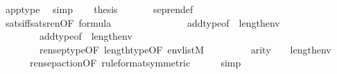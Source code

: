 \begin{isabellebody}
\ app{\isacharunderscore}{\kern0pt}type\ \isamarkupfalse%
\ simp\isanewline
\ \ \isamarkupfalse%
\ {\isacharquery}{\kern0pt}thesis\ \isanewline
\ \ \ \ \isamarkupfalse%
\ sep{\isacharunderscore}{\kern0pt}ren{\isacharunderscore}{\kern0pt}def\isanewline
\ \ \ \ \isamarkupfalse%
\ sats{\isacharunderscore}{\kern0pt}iff{\isacharunderscore}{\kern0pt}sats{\isacharunderscore}{\kern0pt}ren{\isacharbrackleft}{\kern0pt}OF\ {\isacartoucheopen}{\isasymphi}{\isasymin}formula{\isacartoucheclose}\ \ \ \ \ \ \ \isanewline
\ \ \ \ \ \ \ \ add{\isacharunderscore}{\kern0pt}type{\isacharbrackleft}{\kern0pt}of\ {}\ {\isachardoublequoteopen}length{\isacharparenleft}{\kern0pt}env{\isacharparenright}{\kern0pt}{\isachardoublequoteclose}{\isacharbrackright}{\kern0pt}\isanewline
\ \ \ \ \ \ \ \ add{\isacharunderscore}{\kern0pt}type{\isacharbrackleft}{\kern0pt}of\ {}\ {\isachardoublequoteopen}length{\isacharparenleft}{\kern0pt}env{\isacharparenright}{\kern0pt}{\isachardoublequoteclose}{\isacharbrackright}{\kern0pt}\isanewline
\ \ \ \ \ \ \ \ {}\ {}{\isacharparenleft}{\kern0pt}{}{\isacharparenright}{\kern0pt}\ \isanewline
\ \ \ \ \ \ \ \ rensep{\isacharunderscore}{\kern0pt}type{\isacharbrackleft}{\kern0pt}OF\ length{\isacharunderscore}{\kern0pt}type{\isacharbrackleft}{\kern0pt}OF\ {\isacartoucheopen}env{\isasymin}list{\isacharparenleft}{\kern0pt}M{\isacharparenright}{\kern0pt}{\isacartoucheclose}{\isacharbrackright}{\kern0pt}{\isacharbrackright}{\kern0pt}\ \isanewline
\ \ \ \ \ \ \ \ {\isacartoucheopen}arity{\isacharparenleft}{\kern0pt}{\isasymphi}{\isacharparenright}{\kern0pt}\ {\isasymle}\ {}\ {\isacharhash}{\kern0pt}{\isacharplus}{\kern0pt}\ length{\isacharparenleft}{\kern0pt}env{\isacharparenright}{\kern0pt}{\isacartoucheclose}{\isacharbrackright}{\kern0pt}\isanewline
\ \ \ \ \ \ rensep{\isacharunderscore}{\kern0pt}action{\isacharbrackleft}{\kern0pt}OF\ {}{\isacharparenleft}{\kern0pt}{}{\isacharparenright}{\kern0pt}{\isacharcomma}{\kern0pt}rule{\isacharunderscore}{\kern0pt}format{\isacharcomma}{\kern0pt}symmetric{\isacharbrackright}{\kern0pt}\isanewline
\ \ \ \ \isamarkupfalse%
\ simp\isanewline
{}\isamarkupfalse%
%
\endisatagproof
{\isafoldproof}%
%
\isadelimproof
\isanewline
%
\endisadelimproof
%
\isadelimtheory
\isanewline
%
\endisadelimtheory
%
\isatagtheory
{}\isamarkupfalse%
%
\endisatagtheory
{\isafoldtheory}%
%
\isadelimtheory
%
\endisadelimtheory
%
\end{isabellebody}%
